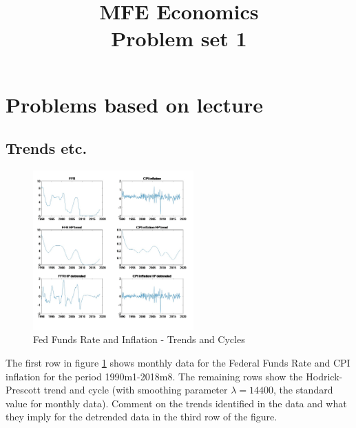 \documentclass[authoryear,11pt]{elsarticle}
\begin{document}
\begin{frontmatter}
\title{MFE Economics\\Problem set 1}
\end{frontmatter}


\section{Problems based on lecture}

\subsection{Trends etc.}
\begin{figure}[!h]
\caption[Fed Funds Rate and Inflation]{Fed Funds Rate and Inflation - Trends and Cycles}
\centering
\label{fig:macro_series}
\includegraphics[width=0.55\textwidth]{macro_series.JPG}
\end{figure}

The first row in figure \ref{fig:macro_series} shows monthly data for the Federal Funds Rate and CPI inflation for the period 1990m1-2018m8. The remaining rows show the Hodrick-Prescott trend and cycle (with smoothing parameter $\lambda =14400$, the standard value for monthly data). Comment on the trends identified in the data and what they imply for the detrended data in the third row of the figure.

\end{document}

